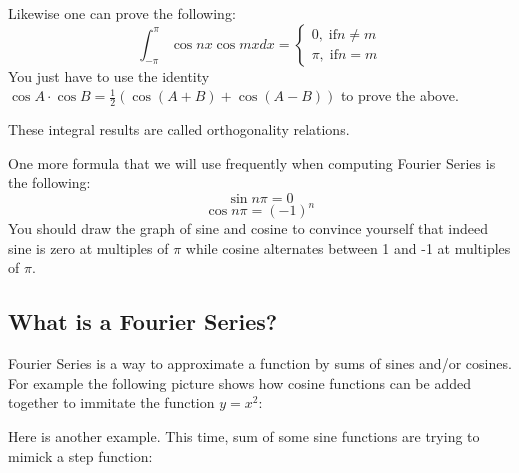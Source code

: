 \documentclass[12pt]{report}
\begin{document}
Likewise one can prove the following:
$$\int_{-\pi}^{\pi} \cos nx \cos mx dx = \begin{cases} 0, \; \mathrm{ if } n \neq m \\ \pi, \; \mathrm{ if } n = m \end{cases} $$
You just have to use the identity $\cos A \cdot \cos B = \frac{1}{2} \left( \cos (A+B) + \cos (A-B) \right)$ to prove the above.

These integral results are called orthogonality relations.

One more formula that we will use frequently when computing Fourier Series is the following:
$$\sin n \pi =0$$
$$\cos n \pi = (-1)^n$$
You should draw the graph of sine and cosine to convince yourself that indeed sine is zero at multiples of $\pi$ while cosine alternates between 1 and -1 at multiples of $\pi$.

\subsection*{What is a Fourier Series?}

Fourier Series is a way to approximate a function by sums of sines and/or cosines. For example the following picture shows how cosine functions can be added together to immitate the function $y=x^2$:
\begin{center}  \end{center}

Here is another example. This time, sum of some sine functions are trying to mimick a step function:
\begin{center}  \end{center}
\end{document}
